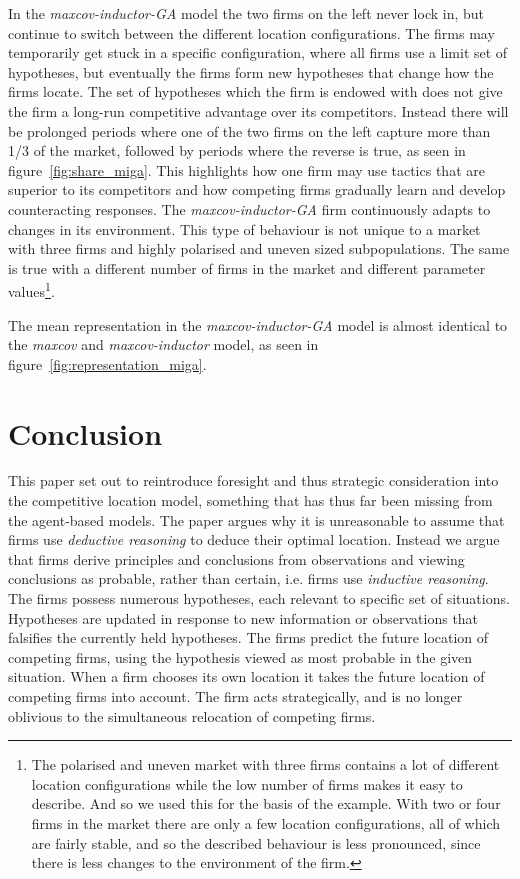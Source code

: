 \documentclass[preprint, 12pt]{elsarticle}
\begin{document}
In the \emph{maxcov-inductor-GA} model the two firms on the left never lock in, but continue to switch between the different location configurations. The firms may temporarily get stuck in a specific configuration, where all firms use a limit set of hypotheses, but eventually the firms form new hypotheses that change how the firms locate. The set of hypotheses which the firm is endowed with does not give the firm a long-run competitive advantage over its competitors. Instead there will be prolonged periods where one of the two firms on the left capture more than 1/3 of the market, followed by periods where the reverse is true, as seen in figure~\ref{fig:share_miga}. This highlights how one firm may use tactics that are superior to its competitors and how competing firms gradually learn and develop counteracting responses. The \emph{maxcov-inductor-GA} firm continuously adapts to changes in its environment. This type of behaviour is not unique to a market with three firms and highly polarised and uneven sized subpopulations. The same is true with a different number of firms in the market and different parameter values\footnote{The polarised and uneven market with three firms contains a lot of different location configurations while the low number of firms makes it easy to describe. And so we used this for the basis of the example. With two or four firms in the market there are only a few location configurations, all of which are fairly stable, and so the described behaviour is less pronounced, since there is less changes to the environment of the firm.}. 

The mean representation in the \emph{maxcov-inductor-GA} model is almost identical to the \emph{maxcov} and \emph{maxcov-inductor} model, as seen in figure~\ref{fig:representation_miga}.


\section{Conclusion}

This paper set out to reintroduce foresight and thus strategic consideration into the competitive location model, something that has thus far been missing from the agent-based models. The paper argues why it is unreasonable to assume that firms use \emph{deductive reasoning} to deduce their optimal location. Instead we argue that firms derive principles and conclusions from observations and viewing conclusions as probable, rather than certain, i.e. firms use \emph{inductive reasoning}. The firms possess numerous hypotheses, each relevant to specific set of situations. Hypotheses are updated in response to new information or observations that falsifies the currently held hypotheses. The firms predict the future location of competing firms, using the hypothesis viewed as most probable in the given situation. When a firm chooses its own location it takes the future location of competing firms into account. The firm acts strategically, and is no longer oblivious to the simultaneous relocation of competing firms.
\end{document}
